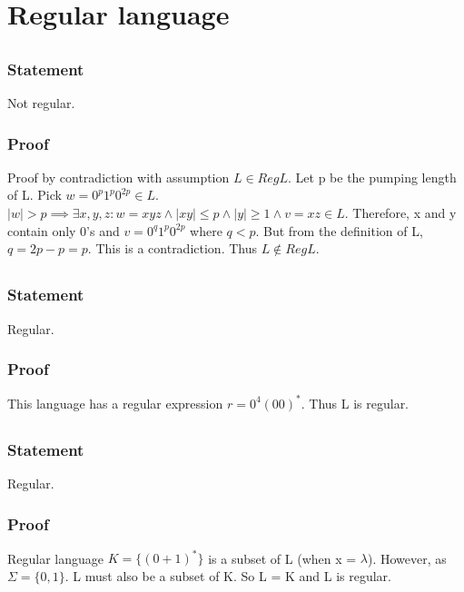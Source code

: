 \documentclass{article}
\begin{document}
\section{Regular language}
\subsection{}
\subsubsection{Statement}
Not regular.
\subsubsection{Proof}
Proof by contradiction with assumption $L \in RegL$. Let p be the pumping length
of L. Pick $w = 0^p1^p0^{2p} \in L$. $\mid w \mid > p \implies \exists x, y, z
: w = xyz \land \mid xy \mid \leq p \land \mid y \mid \geq 1 \land v =
xz \in L$. Therefore, x and y contain only 0's and $ v = 0^q1^p0^{2p}$ where $q
< p$. But from the definition of L, $q = 2p - p = p$. This is a contradiction.
 Thus $L \notin RegL$.
\subsection{}
\subsubsection{Statement}
Regular.
\subsubsection{Proof}
This language has a regular expression $r = 0^4(00)^*$.
Thus L is regular.
\subsection{}
\subsubsection{Statement}
Regular.
\subsubsection{Proof}
Regular language $K = \{(0+1)^*\} $ is a subset of L (when x = $\lambda$).
However, as $\Sigma = \{0, 1\}$. L must also be a subset of K.
So L = K and L is regular.
\subsection{}
\end{document}
